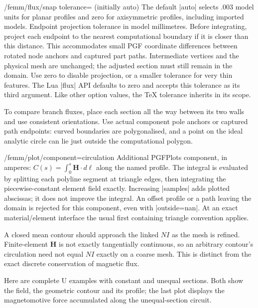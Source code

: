 \begin{key}{/femm/flux/snap tolerance= (initially auto)}
The default |auto| selects .003 model units for planar profiles and zero
for axisymmetric profiles, including imported models.
Endpoint projection tolerance in model millimetres. Before integrating, project
each endpoint to the nearest computational boundary if it is closer than this
distance. This accommodates small PGF coordinate differences between rotated
node anchors and captured part paths. Intermediate vertices and the physical
mesh are unchanged; the adjusted section must still remain in the domain.
Use zero to disable projection, or a smaller tolerance for very thin features.
The Lua |flux| API defaults to zero and accepts this tolerance as its third
argument. Like other option values, the TeX tolerance inherits in its scope.
\end{key}

To compare branch fluxes, place each section all the way between its two walls
and use consistent orientations. Use actual component pole anchors or captured
path endpoints: curved boundaries are polygonalised, and a point on the ideal
analytic circle can lie just outside the computational polygon.

\begin{key}{/femm/plot/component=circulation}
Additional PGFPlots component, in amperes:
$C(s)=\int_0^s\mathbf H\cdot d\boldsymbol\ell$ along the named profile.
The integral is evaluated by splitting each polyline segment at triangle
edges, then integrating the piecewise-constant element field exactly.
Increasing |samples| adds plotted abscissas; it does not improve the integral.
An offset profile or a path leaving the domain is rejected for this component,
even with |outside=nan|. At an exact material/element interface the usual first
containing triangle convention applies.

A closed mean contour should approach the linked $NI$ as the mesh is refined.
Finite-element $\mathbf H$ is not exactly tangentially continuous, so an
arbitrary contour's circulation need not equal $NI$ exactly on a coarse mesh.
This is distinct from the exact discrete conservation of magnetic flux.
\end{key}

Here are complete U examples with constant and unequal sections. Both show
the field, the geometric contour and its profile; the last plot displays
the magnetomotive force accumulated along the unequal-section circuit.

